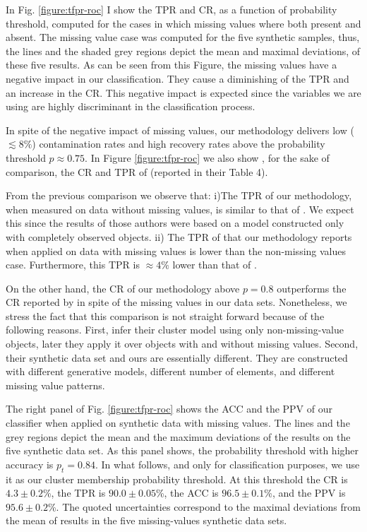In Fig. \ref{figure:tfpr-roc} I show the TPR and CR, as a function of probability threshold, computed for the cases in which missing values where both present and absent. The missing value case was computed for the five synthetic samples, thus, the lines and the shaded grey regions depict the mean and maximal deviations, of these five results. As can be seen from this Figure, the missing values have a negative impact in our classification. They cause a diminishing of the TPR  and an increase in the CR. This negative impact is expected since the variables we are using are highly discriminant in the classification process. 

In spite of the negative impact of missing values, our methodology delivers low ($\lesssim 8\%$) contamination rates and high recovery rates above the probability threshold $p \approx 0.75$. In Figure \ref{figure:tfpr-roc} we also show , for the sake of comparison, the CR and TPR of \citet{Sarro2014} (reported in their Table 4). 

From the previous comparison we observe that: i)The TPR of our methodology, when measured on data without missing values, is similar to that of \citet{Sarro2014}. We expect this since the results of those authors were based on a model constructed only with completely observed objects. ii) The TPR of that our methodology reports when applied on data with missing values is lower than the non-missing values case. Furthermore, this TPR is $\approx 4\%$ lower than that of \citet{Sarro2014}. 

On the other hand, the CR of our methodology above $p=0.8$ outperforms the CR reported by \citet{Sarro2014} in spite of the missing values in our data sets. Nonetheless, we stress the fact that this comparison is not straight forward because of the following reasons. First, \citet{Sarro2014} infer their cluster model using only non-missing-value objects, later they apply it over objects with and without missing values. Second, their synthetic data set and ours are essentially different. They are constructed with different generative models, different number of elements, and different missing value patterns. 

The right panel of Fig. \ref{figure:tfpr-roc} shows the ACC and the PPV of our classifier when applied on synthetic data with missing values. The lines and the grey regions depict the mean and the maximum deviations of the results on the five synthetic data set. As this panel shows, the probability threshold with higher accuracy is $p_t = 0.84$. In what follows, and only for classification purposes, we use it as our cluster membership probability threshold. At this threshold the CR is $4.3\pm0.2$\%, the TPR is $90.0\pm0.05$\%, the ACC is $96.5\pm0.1$\%, and the PPV is $95.6\pm0.2$\%. The quoted uncertainties correspond to the maximal deviations from the mean of results in the five missing-values synthetic data sets.

